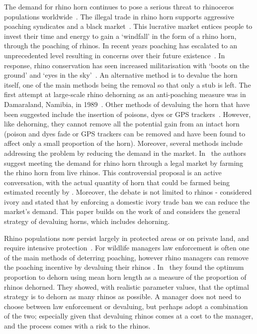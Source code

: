 \documentclass[10pt]{article}
\begin{document}
The demand for rhino horn continues to pose a serious threat to rhinoceros populations 
worldwide~\cite{Amin2006}.
The illegal trade in rhino horn supports aggressive poaching syndicates and a
black market~\cite{Nowell1992, Warchol2003}. This lucrative market entices people to invest
their time and energy to gain a `windfall' in the form of a rhino horn, through the
poaching of rhinos. In recent years poaching has escalated to an unprecedented
level resulting in concerns over their future existence~\cite{Duan2013,Smith1993}.
In response, rhino conservation has seen increased  militarisation with `boots on the
ground' and `eyes in the sky'~\cite{duffy_st}. An alternative method is to
devalue the horn itself, one of the main  methods being the removal so that only
a stub is left. The first attempt at large-scale rhino dehorning as an anti-poaching
measure was in Damaraland, Namibia, in 1989~\cite{Milner1992}. Other methods
of devaluing the horn that have been suggested include
the insertion of poisons, dyes or GPS trackers~\cite{Gill2010,Smith1993}. However,
like dehorning, they cannot remove all the potential gain from an intact horn 
(poison and dyes fade or GPS trackers can be removed and have been found to affect
only a small proportion of the horn). Moreover, several methods
include addressing the problem by reducing the demand in the market. In~\cite{Duan2013}
the authors suggest meeting the demand for rhino horn through a legal market by
farming the rhino horn from live rhinos. This controversial proposal is an active
conversation, with the actual quantity of horn that could be farmed being estimated
recently by \cite{Taylor2017}. Moreover, the debate is not limited to rhinos -
\cite{Harvey2017} considered ivory and stated that by enforcing a domestic ivory
trade ban we can reduce the market's demand. This paper builds on the work of
\cite{Lee} and considers the general strategy of devaluing horns, which includes
dehorning.

Rhino populations now persist largely in protected areas or on private land, and
require intensive protection~\cite{Ferreira2014}. For wildlife managers law 
enforcement is often one of the main methods of deterring poaching, however 
rhino managers can remove the poaching incentive by devaluing their rhinos 
\cite{Milner1992}. In~\cite{Milner1992} they found the 
optimum proportion to dehorn using mean horn length as a measure of the 
proportion of rhinos dehorned. They showed, with realistic parameter values, 
that the optimal strategy is to dehorn as many rhinos as possible. 
A manager does not need to choose between law enforcement or devaluing, but
perhaps adopt a combination of the two; especially given that devaluing rhinos 
comes at a cost to the manager, and the process comes with a risk to the rhinos.
\end{document}
